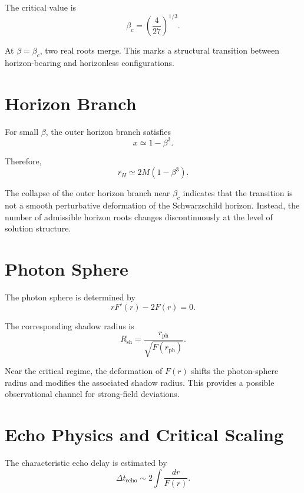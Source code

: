 \documentclass[11pt,a4paper]{article}
\begin{document}
The critical value is
\begin{equation}
\beta_c =
\left(
\frac{4}{27}
\right)^{1/3}.
\end{equation}

At $\beta=\beta_c$, two real roots merge. This marks a structural transition between horizon-bearing and horizonless configurations.

\section{Horizon Branch}

For small $\beta$, the outer horizon branch satisfies
\begin{equation}
x \simeq 1 - \beta^3 .
\end{equation}

Therefore,
\begin{equation}
r_H \simeq 2M(1-\beta^3).
\end{equation}

The collapse of the outer horizon branch near $\beta_c$ indicates that the transition is not a smooth perturbative deformation of the Schwarzschild horizon. Instead, the number of admissible horizon roots changes discontinuously at the level of solution structure.

\section{Photon Sphere}

The photon sphere is determined by
\begin{equation}
rF'(r) - 2F(r) = 0 .
\end{equation}

The corresponding shadow radius is
\begin{equation}
R_{\mathrm{sh}} =
\frac{r_{\mathrm{ph}}}
{\sqrt{F(r_{\mathrm{ph}})}} .
\end{equation}

Near the critical regime, the deformation of $F(r)$ shifts the photon-sphere radius and modifies the associated shadow radius. This provides a possible observational channel for strong-field deviations.

\section{Echo Physics and Critical Scaling}

The characteristic echo delay is estimated by
\begin{equation}
\Delta t_{\mathrm{echo}}
\sim
2 \int \frac{dr}{F(r)} .
\end{equation}
\end{document}
